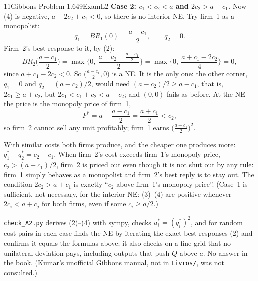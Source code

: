 \begin{exsol}{11}{Gibbons Problem 1.6}{49}{Exam}{L2}
\textbf{Case 2: $c_1 < c_2 < a$ and $2c_2 > a + c_1$.} Now (4) is negative,
$a - 2c_2 + c_1 < 0$, so there is no interior NE. Try firm~1 as a monopolist:
\[
  q_1 = BR_1(0) = \frac{a - c_1}{2}, \qquad q_2 = 0 .
\]
Firm~2's best response to it, by (2):
\[
  BR_2\Big(\frac{a - c_1}{2}\Big) = \max\Big\{0,\ \frac{a - c_2 - \frac{a - c_1}{2}}{2}\Big\}
  = \max\Big\{0,\ \frac{a + c_1 - 2c_2}{4}\Big\} = 0 ,
\]
since $a + c_1 - 2c_2 < 0$. So $\big(\tfrac{a - c_1}{2}, 0\big)$ is a NE. It is the only one: the
other corner, $q_1 = 0$ and $q_2 = (a - c_2)/2$, would need $(a - c_2)/2 \ge a - c_1$, that is,
$2c_1 \ge a + c_2$, but $2c_1 < c_1 + c_2 < a + c_2$; and $(0,0)$ fails as before. At the NE the
price is the monopoly price of firm~1,
\[
  P^* = a - \frac{a - c_1}{2} = \frac{a + c_1}{2} < c_2 ,
\]
so firm~2 cannot sell any unit profitably; firm~1 earns $\big(\frac{a - c_1}{2}\big)^2$.

\interp With similar costs both firms produce, and the cheaper one produces more:
$q_1^* - q_2^* = c_2 - c_1$. When firm~2's cost exceeds firm~1's monopoly price,
$c_2 > (a + c_1)/2$, firm~2 is priced out even though it is not shut out by any rule: firm~1
simply behaves as a monopolist and firm~2's best reply is to stay out. The condition
$2c_2 > a + c_1$ is exactly ``$c_2$ above firm~1's monopoly price''. (Case~1 is sufficient, not
necessary, for the interior NE: (3)--(4) are positive whenever $2c_i < a + c_j$ for both firms,
even if some $c_i \ge a/2$.)

\verify \texttt{check\_A2.py} derives (2)--(4) with sympy, checks $u_i^* = (q_i^*)^2$, and for
random cost pairs in each case finds the NE by iterating the exact best responses (2) and confirms
it equals the formulas above; it also checks on a fine grid that no unilateral deviation pays,
including outputs that push $Q$ above $a$. No answer in the book. (Kumar's unofficial Gibbons
manual, not in \texttt{Livros/}, was not consulted.)

\end{exsol}
